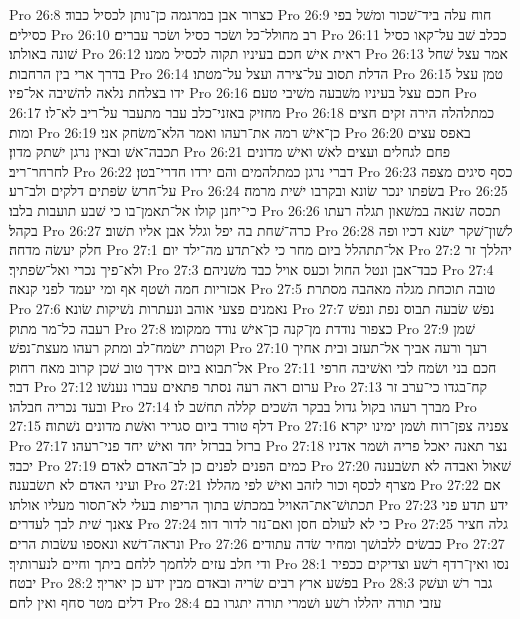 Pro 26:8  כצרור אבן במרגמה כן־נותן לכסיל כבוד׃
Pro 26:9  חוח עלה ביד־שׁכור ומשׁל בפי כסילים׃
Pro 26:10  רב מחולל־כל ושׂכר כסיל ושׂכר עברים׃
Pro 26:11  ככלב שׁב על־קאו כסיל שׁונה באולתו׃
Pro 26:12  ראית אישׁ חכם בעיניו תקוה לכסיל ממנו׃
Pro 26:13  אמר עצל שׁחל בדרך ארי בין הרחבות׃
Pro 26:14  הדלת תסוב על־צירה ועצל על־מטתו׃
Pro 26:15  טמן עצל ידו בצלחת נלאה להשׁיבה אל־פיו׃
Pro 26:16  חכם עצל בעיניו משׁבעה משׁיבי טעם׃
Pro 26:17  מחזיק באזני־כלב עבר מתעבר על־ריב לא־לו׃
Pro 26:18  כמתלהלה הירה זקים חצים ומות׃
Pro 26:19  כן־אישׁ רמה את־רעהו ואמר הלא־משׂחק אני׃
Pro 26:20  באפס עצים תכבה־אשׁ ובאין נרגן ישׁתק מדון׃
Pro 26:21  פחם לגחלים ועצים לאשׁ ואישׁ מדונים לחרחר־ריב׃
Pro 26:22  דברי נרגן כמתלהמים והם ירדו חדרי־בטן׃
Pro 26:23  כסף סיגים מצפה על־חרשׂ שׂפתים דלקים ולב־רע׃
Pro 26:24  בשׂפתו ינכר שׂונא ובקרבו ישׁית מרמה׃
Pro 26:25  כי־יחנן קולו אל־תאמן־בו כי שׁבע תועבות בלבו׃
Pro 26:26  תכסה שׂנאה במשׁאון תגלה רעתו בקהל׃
Pro 26:27  כרה־שׁחת בה יפל וגלל אבן אליו תשׁוב׃
Pro 26:28  לשׁון־שׁקר ישׂנא דכיו ופה חלק יעשׂה מדחה׃
Pro 27:1  אל־תתהלל ביום מחר כי לא־תדע מה־ילד יום׃
Pro 27:2  יהללך זר ולא־פיך נכרי ואל־שׂפתיך׃
Pro 27:3  כבד־אבן ונטל החול וכעס אויל כבד משׁניהם׃
Pro 27:4  אכזריות חמה ושׁטף אף ומי יעמד לפני קנאה׃
Pro 27:5  טובה תוכחת מגלה מאהבה מסתרת׃
Pro 27:6  נאמנים פצעי אוהב ונעתרות נשׁיקות שׂונא׃
Pro 27:7  נפשׁ שׂבעה תבוס נפת ונפשׁ רעבה כל־מר מתוק׃
Pro 27:8  כצפור נודדת מן־קנה כן־אישׁ נודד ממקומו׃
Pro 27:9  שׁמן וקטרת ישׂמח־לב ומתק רעהו מעצת־נפשׁ׃
Pro 27:10  רעך ורעה אביך אל־תעזב ובית אחיך אל־תבוא ביום אידך טוב שׁכן קרוב מאח רחוק׃
Pro 27:11  חכם בני ושׂמח לבי ואשׁיבה חרפי דבר׃
Pro 27:12  ערום ראה רעה נסתר פתאים עברו נענשׁו׃
Pro 27:13  קח־בגדו כי־ערב זר ובעד נכריה חבלהו׃
Pro 27:14  מברך רעהו בקול גדול בבקר השׁכים קללה תחשׁב לו׃
Pro 27:15  דלף טורד ביום סגריר ואשׁת מדונים נשׁתוה׃
Pro 27:16  צפניה צפן־רוח ושׁמן ימינו יקרא׃
Pro 27:17  ברזל בברזל יחד ואישׁ יחד פני־רעהו׃
Pro 27:18  נצר תאנה יאכל פריה ושׁמר אדניו יכבד׃
Pro 27:19  כמים הפנים לפנים כן לב־האדם לאדם׃
Pro 27:20  שׁאול ואבדה לא תשׂבענה ועיני האדם לא תשׂבענה׃
Pro 27:21  מצרף לכסף וכור לזהב ואישׁ לפי מהללו׃
Pro 27:22  אם תכתושׁ־את־האויל במכתשׁ בתוך הריפות בעלי לא־תסור מעליו אולתו׃
Pro 27:23  ידע תדע פני צאנך שׁית לבך לעדרים׃
Pro 27:24  כי לא לעולם חסן ואם־נזר לדור דור׃
Pro 27:25  גלה חציר ונראה־דשׁא ונאספו עשׂבות הרים׃
Pro 27:26  כבשׂים ללבושׁך ומחיר שׂדה עתודים׃
Pro 27:27  ודי חלב עזים ללחמך ללחם ביתך וחיים לנערותיך׃
Pro 28:1  נסו ואין־רדף רשׁע וצדיקים ככפיר יבטח׃
Pro 28:2  בפשׁע ארץ רבים שׂריה ובאדם מבין ידע כן יאריך׃
Pro 28:3  גבר רשׁ ועשׁק דלים מטר סחף ואין לחם׃
Pro 28:4  עזבי תורה יהללו רשׁע ושׁמרי תורה יתגרו בם׃

